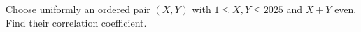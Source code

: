 Choose uniformly an ordered pair $(X,Y)$ with $1\le X,Y\le2025$ and $X+Y$ even. Find their correlation coefficient.

